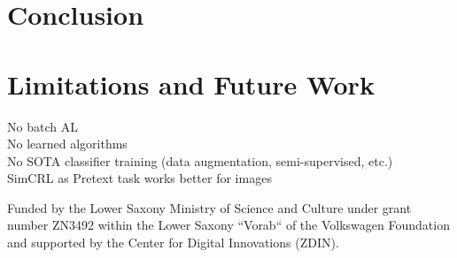 \documentclass[]{article}
\begin{document}
\section{Conclusion}

\section{Limitations and Future Work}
No batch AL \\
No learned algorithms \\
No SOTA classifier training (data augmentation, semi-supervised, etc.) \\
SimCRL as Pretext task works better for images

\newpage

\begin{ack}
	Funded by the Lower Saxony Ministry of Science and Culture under grant number ZN3492 within the Lower Saxony “Vorab“ of the Volkswagen Foundation and supported by the Center for Digital Innovations (ZDIN).
\end{ack}


 

\appendix
\end{document}

